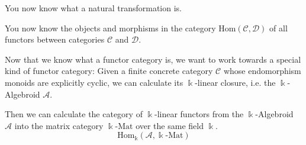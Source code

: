 \documentclass[12pt,compress]{beamer}
\begin{document}
\begin{frame}
\begin{centering}
You now know what a natural transformation is.
\end{centering}
\end{frame}

\begin{frame}
\begin{centering}
You now know the objects and morphisms in the category $\mathrm{Hom}(\mathcal{C},\mathcal{D})$ of all functors between categories $\mathcal{C}$ and $\mathcal{D}$.
\end{centering}
\end{frame}


\begin{frame}
Now that we know what a functor category is, we want to work towards a special kind of functor category:
Given a finite concrete category $\mathcal{C}$ whose endomorphism monoids are explicitly cyclic, we can
calculate its $\Bbbk$-linear closure, i.e. the $\Bbbk$-Algebroid $\mathcal{A}$.

Then we can calculate the category of $\Bbbk$-linear functors from the $\Bbbk$-Algebroid $\mathcal{A}$
into the matrix category $\Bbbk\text{-}\mathrm{Mat}$ over the same field $\Bbbk$.
\[
\mathrm{Hom}_{\Bbbk}(\mathcal{A},\Bbbk\text{-}\mathrm{Mat})
\]
\end{frame}
\end{document}
